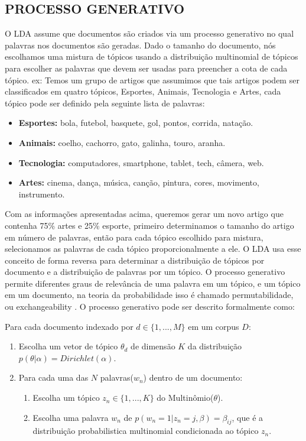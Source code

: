\documentclass[12pt,a4paper]{article}
\begin{document}
\subsection{PROCESSO GENERATIVO}
O LDA assume que documentos são criados via um processo generativo no qual palavras nos documentos são geradas. Dado o tamanho do documento,
 nós escolhamos uma mistura de tópicos usando a distribuição multinomial de tópicos para escolher as palavras que devem ser usadas para preencher a cota de cada tópico. ex:
 Temos um grupo de artigos que assumimos que tais artigos podem ser classificados em quatro tópicos, Esportes, Animais, Tecnologia e Artes, cada tópico pode ser definido pela seguinte lista de palavras:

\begin{itemize}
  \item \textbf{ Esportes:} bola, futebol, basquete, gol, pontos, corrida, natação.
  \item \textbf{ Animais:} coelho, cachorro, gato, galinha, touro, aranha.
  \item \textbf{ Tecnologia:} computadores, smartphone, tablet, tech, câmera, web.
  \item \textbf{ Artes:} cinema, dança, música, canção, pintura, cores, movimento, instrumento.
\end{itemize}

Com as informações apresentadas acima, queremos gerar um novo artigo que contenha 75\% artes e 25\% esporte, primeiro determinamos o tamanho do artigo em número de palavras,
 então para cada tópico escolhido para mistura, selecionamos as palavras de cada tópico proporcionalmente a ele. 
 O LDA usa esse conceito de forma reversa para determinar a distribuição de tópicos por documento e a distribuição de palavras por um tópico. 
 O processo generativo permite diferentes graus de relevância de uma palavra em um tópico, e um tópico em um documento, na teoria da probabilidade isso é chamado permutabilidade,
 ou exchangeability \cite{aldous1985exchangeability}. O processo generativo pode ser descrito formalmente como:

Para cada documento indexado por $d \in \{1,. . . , M\}$ em um corpus $D$:

\begin{enumerate}
  \item Escolha um vetor de tópico $\theta _d$ de dimensão $K$ da distribuição $p(\theta|\alpha)=Dirichlet(\alpha)$.
  \item Para cada uma das $N$ palavras($w_n$) dentro de um documento:
  \begin{enumerate}
  	\item Escolha um tópico \(z_n \in \{1,. . . , K\}\) do Multinômio($\theta$).
    \item Escolha uma palavra $w_n$ de \(p(w_n=1| z_n=j,\beta)=\beta _{ij}\), que é a distribuição probabilistica multinomial condicionada ao tópico $z_n$.
  \end{enumerate}
\end{enumerate}
\end{document}
